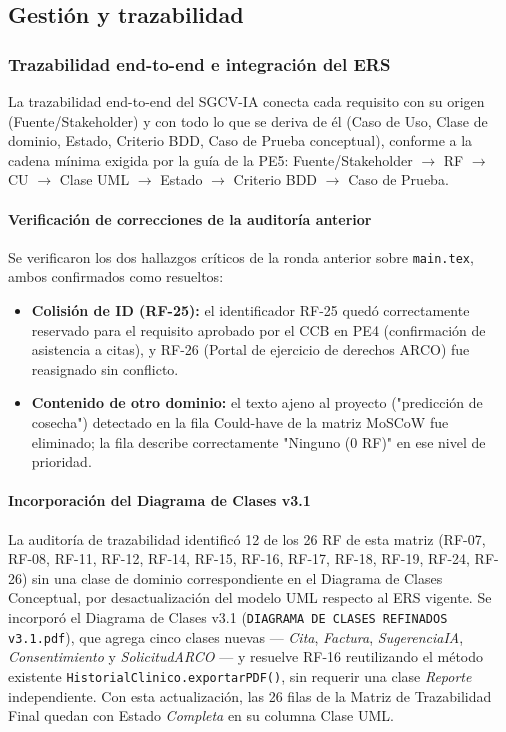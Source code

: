 \subsection{Gestión y trazabilidad}\label{gestiuxf3n-y-trazabilidad}

\subsubsection{Trazabilidad end-to-end e integración del ERS}\label{trazabilidad-end-to-end}

La trazabilidad end-to-end del SGCV-IA conecta cada requisito con su
origen (Fuente/Stakeholder) y con todo lo que se deriva de él (Caso de
Uso, Clase de dominio, Estado, Criterio BDD, Caso de Prueba conceptual),
conforme a la cadena mínima exigida por la guía de la PE5:
Fuente/Stakeholder $\rightarrow$ RF $\rightarrow$ CU $\rightarrow$ Clase
UML $\rightarrow$ Estado $\rightarrow$ Criterio BDD $\rightarrow$ Caso
de Prueba.

\paragraph{Verificación de correcciones de la auditoría anterior}

Se verificaron los dos hallazgos críticos de la ronda anterior sobre
\texttt{main.tex}, ambos confirmados como resueltos:

\begin{itemize}
\item \textbf{Colisión de ID (RF-25):} el identificador RF-25 quedó
  correctamente reservado para el requisito aprobado por el CCB en
  PE4 (confirmación de asistencia a citas), y RF-26 (Portal de
  ejercicio de derechos ARCO) fue reasignado sin conflicto.
\item \textbf{Contenido de otro dominio:} el texto ajeno al proyecto
  ("predicción de cosecha") detectado en la fila Could-have de la
  matriz MoSCoW fue eliminado; la fila describe correctamente
  "Ninguno (0 RF)" en ese nivel de prioridad.
\end{itemize}

\paragraph{Incorporación del Diagrama de Clases v3.1}

La auditoría de trazabilidad identificó 12 de los 26 RF de esta
matriz (RF-07, RF-08, RF-11, RF-12, RF-14, RF-15, RF-16, RF-17,
RF-18, RF-19, RF-24, RF-26) sin una clase de dominio correspondiente
en el Diagrama de Clases Conceptual, por desactualización del modelo
UML respecto al ERS vigente. Se incorporó el Diagrama de Clases
v3.1 (\texttt{DIAGRAMA DE CLASES REFINADOS v3.1.pdf}), que agrega
cinco clases nuevas --- \textit{Cita}, \textit{Factura},
\textit{SugerenciaIA}, \textit{Consentimiento} y
\textit{SolicitudARCO} --- y resuelve RF-16 reutilizando el método
existente \texttt{HistorialClinico.exportarPDF()}, sin requerir una
clase \textit{Reporte} independiente. Con esta actualización, las 26
filas de la Matriz de Trazabilidad Final quedan con Estado
\textit{Completa} en su columna Clase UML.


